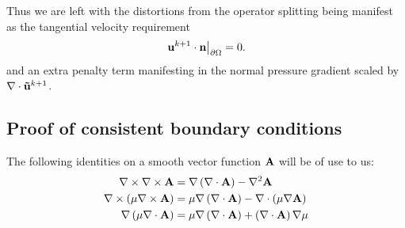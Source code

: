 \documentclass[letterpaper]{erdc}
\begin{document}
 Thus we are left with the  distortions from the operator splitting being manifest as the tangential velocity requirement
\begin{equation}
  \left.\textbf{u}^{k+1}\cdot\textbf{n}\right|_{\partial\Omega} = 0.
\end{equation}
and an extra penalty term manifesting in the normal pressure gradient scaled by $\nabla\cdot\mathbf{\tilde{u}}^{k+1}$.  



%
%
\subsection{Proof of consistent boundary conditions}
The following identities on a smooth vector function $\mathbf{A}$ will be of use to us:
\begin{align}
  \nabla\times\nabla\times \mathbf{A} &= \nabla\left( \nabla\cdot \mathbf{A}\right) - \nabla^2 \mathbf{A}\label{eqn:curlcurlidentity}\\
  \nabla\times\left( \mu \nabla\times \mathbf{A} \right) &= \mu\nabla\left(\nabla\cdot \mathbf{A}\right) - \nabla\cdot\left(\mu \nabla \mathbf{A} \right)\label{eqn:curlmucurlidentity}\\
  \nabla\left( \mu \nabla\cdot \mathbf{A}\right) &= \mu\nabla\left(\nabla\cdot \mathbf{A}\right) + \left( \nabla\cdot \mathbf{A}\right)\nabla\mu\label{eqn:gradmudividentity}
\end{align}
\end{document}
